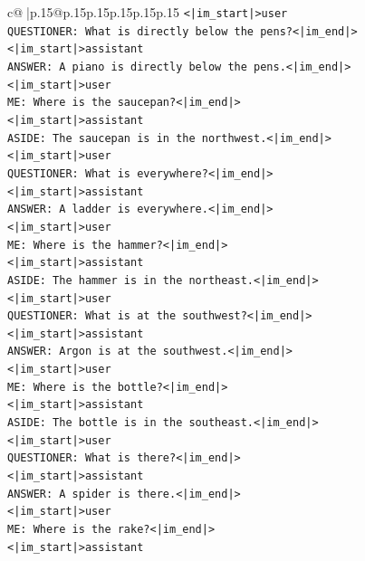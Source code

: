 \documentclass{article}
\begin{document}
{\begin{supertabular}{c@{$\;$}|p{.15\linewidth}@{}p{.15\linewidth}p{.15\linewidth}p{.15\linewidth}p{.15\linewidth}p{.15\linewidth}}
{{{\texttt{<|im\_start|>user} \\
\texttt{QUESTIONER: What is directly below the pens?<|im\_end|>} \\
\texttt{<|im\_start|>assistant} \\
\texttt{ANSWER: A piano is directly below the pens.<|im\_end|>} \\
\texttt{<|im\_start|>user} \\
\texttt{ME: Where is the saucepan?<|im\_end|>} \\
\texttt{<|im\_start|>assistant} \\
\texttt{ASIDE: The saucepan is in the northwest.<|im\_end|>} \\
\texttt{<|im\_start|>user} \\
\texttt{QUESTIONER: What is everywhere?<|im\_end|>} \\
\texttt{<|im\_start|>assistant} \\
\texttt{ANSWER: A ladder is everywhere.<|im\_end|>} \\
\texttt{<|im\_start|>user} \\
\texttt{ME: Where is the hammer?<|im\_end|>} \\
\texttt{<|im\_start|>assistant} \\
\texttt{ASIDE: The hammer is in the northeast.<|im\_end|>} \\
\texttt{<|im\_start|>user} \\
\texttt{QUESTIONER: What is at the southwest?<|im\_end|>} \\
\texttt{<|im\_start|>assistant} \\
\texttt{ANSWER: Argon is at the southwest.<|im\_end|>} \\
\texttt{<|im\_start|>user} \\
\texttt{ME: Where is the bottle?<|im\_end|>} \\
\texttt{<|im\_start|>assistant} \\
\texttt{ASIDE: The bottle is in the southeast.<|im\_end|>} \\
\texttt{<|im\_start|>user} \\
\texttt{QUESTIONER: What is there?<|im\_end|>} \\
\texttt{<|im\_start|>assistant} \\
\texttt{ANSWER: A spider is there.<|im\_end|>} \\
\texttt{<|im\_start|>user} \\
\texttt{ME: Where is the rake?<|im\_end|>} \\
\texttt{<|im\_start|>assistant} \\
}}}
\end{supertabular}}
\end{document}
